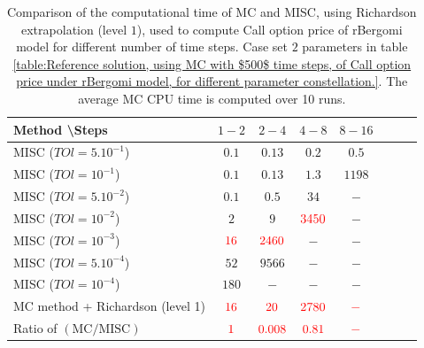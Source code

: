 \documentclass[11pt]{article}
\begin{document}
\begin{table}[h!]
	\centering
	\begin{tabular}{l*{6}{c}r}
		Method \textbackslash  Steps            & $1-2$ & $2-4$ & $4-8$ & $8-16$ &   \\
		\hline
			MISC ($TOl=5.10^{-1}$)  & $0.1$ & $0.13$ & $0.2$ & $0.5$  \\
		MISC ($TOl=10^{-1}$)  & $0.1$ & $0.13$ & $1.3$ & $1198$  \\
			MISC ($TOl=5.10^{-2}$)  & $0.1$ & $0.5$ & $34$ & $-$  \\
		MISC ($TOl=10^{-2}$)  & $2$ & $9$ & ${\color{red}3450}$ & $-$  \\
			MISC ($TOl=10^{-3}$)  & ${\color{red}16}$ & ${\color{red}2460}$ & $-$ & $-$  \\
			
				MISC ($TOl=5.10^{-4}$)  & $52$ & $9566$ & $-$ & $-$  \\
				MISC ($TOl=10^{-4}$)  & $180$ & $-$ & $-$ & $-$  \\
		\hline	
			MC method + Richardson (level 1)  &${\color{red}16}$ & ${\color{red}20}$  & ${\color{red}2780}$  & ${\color{red}-}$ \\
			
\hline	
	Ratio of $\left(\text{MC}/ \text{MISC} \right)$  &${\color{red}1}$ & ${\color{red}    0.008
	}$  & ${\color{red} 0.81
}$  & ${\color{red}-}$ \\
		\hline
	\end{tabular}
	\caption{Comparison of the computational time of  MC and MISC, using Richardson extrapolation (level $1$), used to compute Call option price of rBergomi model for different number of time steps. Case set $2$ parameters in table \ref{table:Reference solution, using MC with $500$ time steps, of Call option price under rBergomi model, for different parameter constellation.}. The
average MC CPU time is computed over 10 runs.}
	\label{Comparsion of the computational time of  MC and MISC, using Richardson extrapolation (level $1$), used to compute Call option price of rBergomi model for different number of time steps. Case set $2$ parameters}
\end{table}
\end{document}

